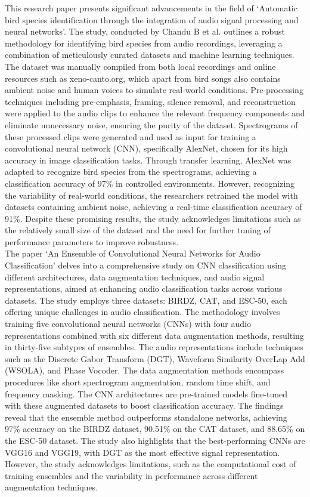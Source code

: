 This research paper presents significant advancements in the field of
`Automatic bird species identification through the integration of audio signal
processing and neural networks'. The study, conducted by Chandu B et al.
outlines a robust methodology for identifying bird
species from audio recordings, leveraging a combination of meticulously curated
datasets and  machine learning techniques. The dataset was manually compiled
from both local recordings and
online resources such as xeno-canto.org, which apart from bird songs also
contains ambient noise and
human voices to simulate real-world conditions. Pre-processing techniques
including pre-emphasis, framing, silence removal, and reconstruction were
applied to the audio clips to enhance the relevant frequency components and
eliminate unnecessary noise, ensuring the purity of the dataset. Spectrograms
of these processed clips were generated and used as input for training a
convolutional neural network (CNN), specifically AlexNet, chosen for its high
accuracy in image classification tasks. Through transfer learning, AlexNet was
adapted to recognize bird species from the spectrograms, achieving a
classification accuracy of 97\% in controlled environments. However,
recognizing the variability of real-world conditions, the researchers retrained
the model with datasets containing ambient noise, achieving a real-time
classification accuracy of 91\%. Despite these promising results, the study
acknowledges limitations such as the relatively small size of the dataset and
the need for further tuning of performance parameters to improve
robustness\cite{chandu2020automated}.\\

The paper `An Ensemble of Convolutional Neural Networks for Audio
Classification' delves into a comprehensive study on CNN classification using
different architectures, data augmentation techniques, and audio signal
representations, aimed at enhancing audio classification tasks across various
datasets. The study employs three datasets: BIRDZ, CAT, and ESC-50, each
offering unique challenges in audio classification. The methodology involves
training five convolutional neural networks (CNNs) with four audio
representations combined with six different data augmentation methods,
resulting in thirty-five subtypes of ensembles. The audio representations
include techniques such as the Discrete Gabor Transform (DGT), Waveform
Similarity OverLap Add (WSOLA), and Phase Vocoder. The data augmentation
methods encompass procedures like short spectrogram augmentation, random time
shift, and frequency masking. The CNN architectures are pre-trained models
fine-tuned with these augmented datasets to boost classification accuracy. The
findings reveal that the ensemble method outperforms standalone networks,
achieving 97\% accuracy on the BIRDZ dataset, 90.51\% on the CAT dataset, and
88.65\% on the ESC-50 dataset. The study also highlights that the
best-performing CNNs are VGG16 and VGG19, with DGT as the most effective signal
representation. However, the study acknowledges limitations, such as the
computational cost of training ensembles and the variability in performance
across different augmentation techniques\cite{nanni2021ensemble}.\\

